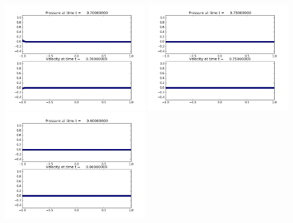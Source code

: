 \documentclass[11pt]{article}
\begin{document}
\vskip 10pt 
\includegraphics[width=0.475\textwidth]{frame0014fig1.png}
\vskip 10pt 
\includegraphics[width=0.475\textwidth]{frame0015fig1.png}
\vskip 10pt 
\includegraphics[width=0.475\textwidth]{frame0016fig1.png}
\end{document}
